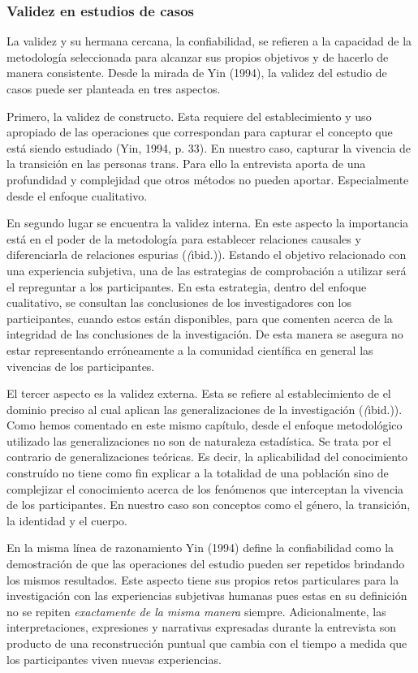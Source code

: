     \subsubsection{Validez en estudios de casos}
La validez y su hermana cercana, la confiabilidad, se refieren a la capacidad
de la metodología seleccionada para alcanzar sus propios objetivos y de
hacerlo de manera consistente.
Desde la mirada de Yin (1994), la validez del estudio de casos puede ser
planteada en tres aspectos.

Primero, la validez de constructo.
Esta requiere del establecimiento y uso apropiado de las operaciones que
correspondan para capturar el concepto que está siendo estudiado (Yin, 1994, p.
33).
En nuestro caso, capturar la vivencia de la transición en las personas trans.
Para ello la entrevista aporta de una profundidad y complejidad que otros
métodos no pueden aportar.
Especialmente desde el enfoque cualitativo.

En segundo lugar se encuentra la validez interna.
En este aspecto la importancia está en el poder de la metodología para
establecer relaciones causales y diferenciarla de relaciones espurias
(\emph(ibid.)).
Estando el objetivo relacionado con una experiencia subjetiva, una de las
estrategias de comprobación a utilizar será el repreguntar a los participantes.
En esta estrategia, dentro del enfoque cualitativo, se consultan las
conclusiones de los investigadores con los participantes, cuando estos están
disponibles, para que comenten acerca de la integridad de las conclusiones de
la investigación.
De esta manera se asegura no estar representando erróneamente a la comunidad
científica en general las vivencias de los participantes.

El tercer aspecto es la validez externa.
Esta se refiere al establecimiento de el dominio preciso al cual aplican las
generalizaciones de la investigación (\emph(ibid.)).
Como hemos comentado en este mismo capítulo, desde el enfoque metodológico
utilizado las generalizaciones no son de naturaleza estadística.
Se trata por el contrario de generalizaciones teóricas.
Es decir, la aplicabilidad del conocimiento construído no tiene como fin
explicar a la totalidad de una población sino de complejizar el conocimiento
acerca de los fenómenos que interceptan la vivencia de los participantes.
En nuestro caso son conceptos como el género, la transición, la identidad y el
cuerpo.

En la misma línea de razonamiento Yin (1994) define la confiabilidad como la
demostración de que las operaciones del estudio pueden ser repetidos
brindando los mismos resultados.
Este aspecto tiene sus propios retos particulares para la investigación con
las experiencias subjetivas humanas pues estas en su definición no se repiten
\emph{exactamente de la misma manera} siempre.
Adicionalmente, las interpretaciones, expresiones y narrativas expresadas
durante la entrevista son producto de una reconstrucción puntual que cambia
con el tiempo a medida que los participantes viven nuevas experiencias.

